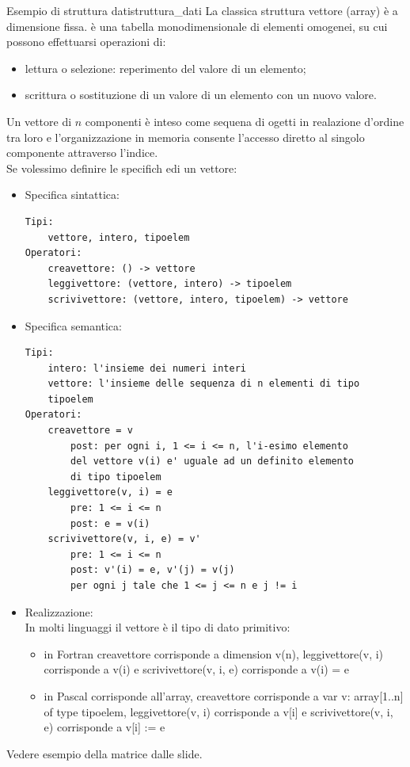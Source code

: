 \documentclass[12pt]{report}
\newcommand{\nmu}{}
\begin{document}
	\begin{example}{\nmu Esempio di struttura dati}{struttura_dati}
		La classica struttura vettore (array) è a dimensione fissa. è una tabella monodimensionale di elementi omogenei, su cui possono effettuarsi operazioni di:
		\begin{itemize}
			\item lettura o selezione: reperimento del valore di un elemento;
			\item scrittura o sostituzione di un valore di un elemento con un nuovo valore.
		\end{itemize}
		Un vettore di $n$ componenti è inteso come sequena di ogetti in realazione d'ordine tra loro e l'organizzazione in memoria consente l'accesso diretto al singolo componente attraverso l'indice. \\
		Se volessimo definire le specifich edi un vettore:
		\begin{itemize}
			\item Specifica sintattica:
			\begin{lstlisting}[style=normalstyle]
Tipi:
	vettore, intero, tipoelem
Operatori:
	creavettore: () -> vettore
	leggivettore: (vettore, intero) -> tipoelem
	scrivivettore: (vettore, intero, tipoelem) -> vettore
\end{lstlisting}
			\item Specifica semantica:
			\begin{lstlisting}[style=normalstyle]
Tipi:
	intero: l'insieme dei numeri interi
	vettore: l'insieme delle sequenza di n elementi di tipo
	tipoelem
Operatori:
	creavettore = v
		post: per ogni i, 1 <= i <= n, l'i-esimo elemento
		del vettore v(i) e' uguale ad un definito elemento
		di tipo tipoelem
	leggivettore(v, i) = e
		pre: 1 <= i <= n
		post: e = v(i)
	scrivivettore(v, i, e) = v'
		pre: 1 <= i <= n
		post: v'(i) = e, v'(j) = v(j)
		per ogni j tale che 1 <= j <= n e j != i
\end{lstlisting}
			\item Realizzazione: \\
			In molti linguaggi il vettore è il tipo di dato primitivo:
			\begin{itemize}
				\item in Fortran creavettore corrisponde a dimension v(n), leggivettore(v, i) corrisponde a v(i) e scrivivettore(v, i, e) corrisponde a v(i) = e
				\item in Pascal corrisponde all'array, creavettore corrisponde a var v: array[1..n] of type tipoelem, leggivettore(v, i) corrisponde a v[i] e scrivivettore(v, i, e) corrisponde a v[i] := e
			\end{itemize}
		\end{itemize}
	\end{example}
	Vedere esempio della matrice dalle slide.
\end{document}
